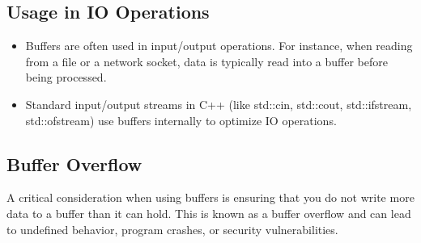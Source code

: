 \documentclass{report}
\begin{document}
    \pagebreak 
    \subsection{Usage in IO Operations}
    \bigbreak \noindent 
    \begin{itemize}
        \item Buffers are often used in input/output operations. For instance, when reading from a file or a network socket, data is typically read into a buffer before being processed.
        \item Standard input/output streams in C++ (like std::cin, std::cout, std::ifstream, std::ofstream) use buffers internally to optimize IO operations.
    \end{itemize}

    \bigbreak \noindent 
    \subsection{Buffer Overflow}
    \bigbreak \noindent 
    A critical consideration when using buffers is ensuring that you do not write more data to a buffer than it can hold. This is known as a buffer overflow and can lead to undefined behavior, program crashes, or security vulnerabilities.

    \pagebreak 
    \bigbreak \noindent 
\end{document}
